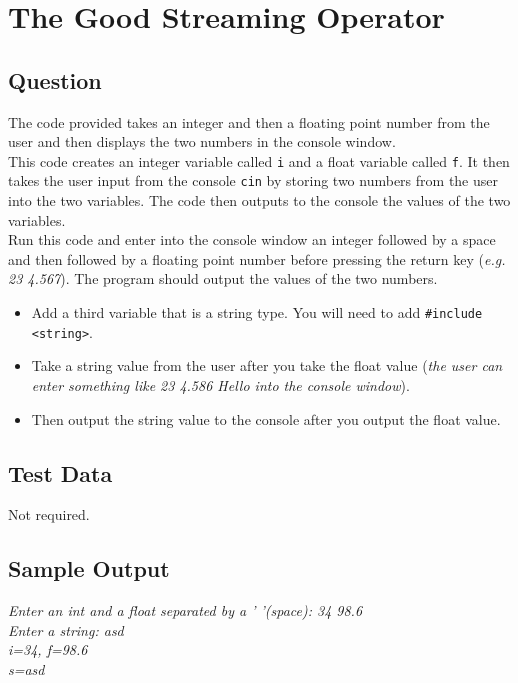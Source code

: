 \section{The Good Streaming Operator}
    \subsection*{Question}
    The code provided takes an integer and then a floating point number from the user and then displays the two numbers in the console window. \\
        
    This code creates an integer variable called \texttt{i} and a float variable called \texttt{f}. 
    It then takes the user input from the console \texttt{cin} by storing two numbers from the user into the two variables. 
    The code then outputs to the console the values of the two variables. \\
        
    Run this code and enter into the console window an integer followed by a space and then followed by a floating point number before pressing the return key (\textit{e.g. 23  4.567}). 
    The program should output the values of the two numbers.\\

    \begin{itemize}
        \item Add a third variable that is a string type. You will need to add \texttt{#include <string>}.

        \item Take a string value from the user after you take the float value (\textit{the user can enter something like 23  4.586  Hello into the console window}).

        \item Then output the string value to the console after you output the float value.
    \end{itemize}
            
    \subsection*{Test Data}
        Not required.
        
    \subsection*{Sample Output}
        \noindent\textit{
            Enter an int and a float separated by a ' '(space): 34 98.6\\
            Enter a string: asd\\
            i=34, f=98.6\\
            s=asd\\
        }

